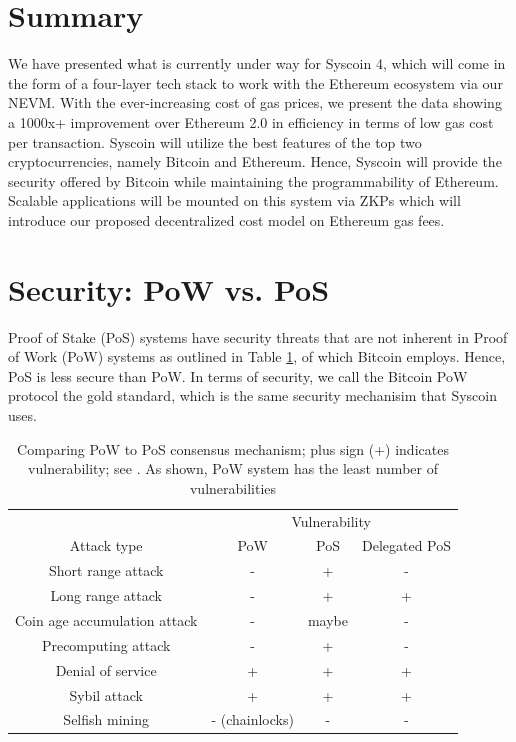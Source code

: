 \documentclass[peerreview]{ieeesyscoin}
\begin{document}
\section{Summary}
\label{section:summary}
We have presented what is currently under way for Syscoin 4, which will come in the form of a four-layer tech stack to work with the Ethereum ecosystem via our NEVM. With the ever-increasing cost of gas prices, we present the data showing a 1000x+ improvement over Ethereum 2.0 in efficiency in terms of low gas cost per transaction. Syscoin will utilize the best features of the top two cryptocurrencies, namely Bitcoin and Ethereum. Hence, Syscoin will provide the security offered by Bitcoin while maintaining the programmability of Ethereum. Scalable applications will be mounted on this system via ZKPs which will introduce our proposed decentralized cost model on Ethereum gas fees.

\appendices

\section{Security: PoW vs. PoS}

Proof of Stake (PoS) systems have security threats that are not inherent in Proof of Work (PoW) systems as outlined in Table \ref{table:pow_vs_pos}, of which Bitcoin employs. Hence, PoS is less secure than PoW. In terms of security, we call the Bitcoin PoW protocol the gold standard, which is the same security mechanisim that Syscoin uses. 

\begin{table}[h!]
\centering
\begin{tabular}{ |c|c|c|c| } 
\hline
 & \multicolumn{3}{|c|}{ Vulnerability } \\
 Attack type & PoW & PoS & Delegated PoS \\
\hline
Short range attack & - & + & - \\
Long range attack & - & + & + \\
Coin age accumulation attack & - & maybe & - \\
Precomputing attack & - & + & - \\
Denial of service & + & + & + \\
Sybil attack & + & + & + \\
Selfish mining & - (chainlocks) & - & - \\
\hline
\end{tabular}
\caption{Comparing PoW to PoS consensus mechanism; plus sign (+) indicates vulnerability; see \cite{Bit15}. As shown, PoW system has the least number of vulnerabilities}
\label{table:pow_vs_pos}
\end{table}
\end{document}
